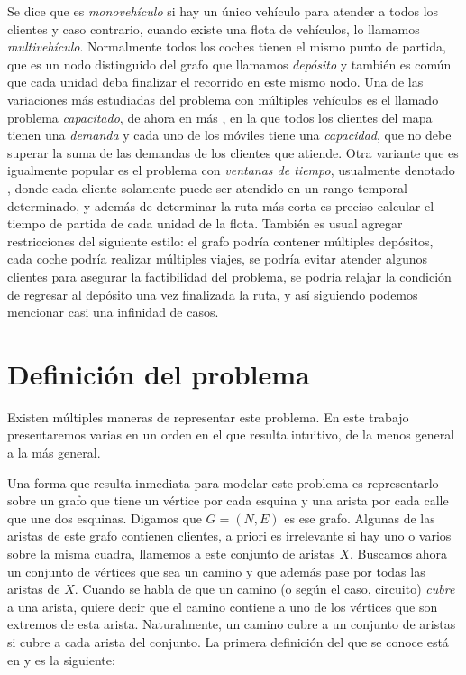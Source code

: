 Se dice que  es \emph{monovehículo} si hay un único vehículo para atender a todos los clientes y caso contrario, cuando existe una flota de vehículos, lo llamamos \emph{multivehículo}. Normalmente todos los coches tienen el mismo punto de partida, que es un nodo distinguido del grafo que llamamos \emph{depósito} y también es común que cada unidad deba finalizar el recorrido en este mismo nodo. Una de las variaciones más estudiadas del problema con múltiples vehículos es el llamado problema \emph{capacitado}, de ahora en más , en la que todos los clientes del mapa tienen una \emph{demanda} y cada uno de los móviles tiene una \emph{capacidad}, que no debe superar la suma de las demandas de los clientes que atiende. Otra variante que es igualmente popular es el problema con \emph{ventanas de tiempo}, usualmente denotado , donde cada cliente solamente puede ser atendido en un rango temporal determinado, y además de determinar la ruta más corta es preciso calcular el tiempo de partida de cada unidad de la flota. También es usual agregar restricciones del siguiente estilo: el grafo podría contener múltiples depósitos, cada coche podría realizar múltiples viajes, se podría evitar atender algunos clientes para asegurar la factibilidad del problema, se podría relajar la condición de regresar al depósito una vez finalizada la ruta, y así siguiendo podemos mencionar casi una infinidad de casos.


\section{Definición del problema}

Existen múltiples maneras de representar este problema. En este trabajo presentaremos varias en un orden en el que resulta intuitivo, de la menos general a la más general. 

Una forma que resulta inmediata para modelar este problema es representarlo sobre un grafo que tiene un vértice por cada esquina y una arista por cada calle que une dos esquinas. Digamos que $G = (N, E)$ es ese grafo. Algunas de las aristas de este grafo contienen clientes, a priori es irrelevante si hay uno o varios sobre la misma cuadra, llamemos a este conjunto de aristas $X$. Buscamos ahora un conjunto de vértices que sea un camino y que además pase por todas las aristas de $X$. Cuando se habla de que un camino (o según el caso, circuito) \emph{cubre} a una arista, quiere decir que el camino contiene a uno de los vértices que son extremos de esta arista. Naturalmente, un camino cubre a un conjunto de aristas si cubre a cada arista del conjunto. La primera definición del  que se conoce está en \cite{tagliavini} y es la siguiente:


